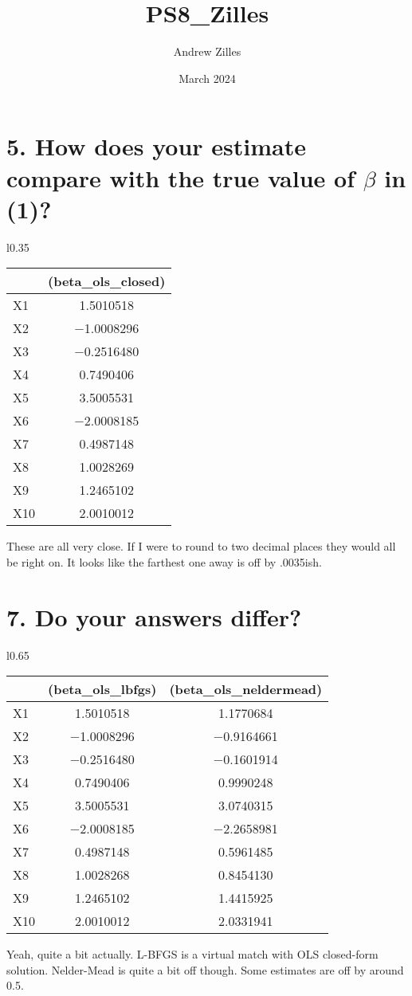 \documentclass{article}
\title{PS8\_Zilles}
\author{Andrew Zilles}
\date{March 2024}
\begin{document}
\maketitle

\section*{5. How does your estimate compare with the true value of ${\beta}$ in (1)?}

\begin{wraptable}{l}{0.35\textwidth}
\centering   
\begin{tabular}[t]{lc}
\toprule
  & (beta\_ols\_closed)\\
\midrule
X1 & \num{1.5010518}\\
X2 & \num{-1.0008296}\\
X3 & \num{-0.2516480}\\
X4 & \num{0.7490406}\\
X5 & \num{3.5005531}\\
X6 & \num{-2.0008185}\\
X7 & \num{0.4987148}\\
X8 & \num{1.0028269}\\
X9 & \num{1.2465102}\\
X10 & \num{2.0010012}\\
\bottomrule
\end{tabular}
\end{wraptable}

These are all very close. If I were to round to two decimal places they would all be right on. It looks like the farthest one away is off by .0035ish.


\clearpage
\section*{7. Do your answers differ?}

\begin{wraptable}{l}{0.65 \textwidth}
\centering
\begin{tabular}[t]{lcc}
\toprule
  & (beta\_ols\_lbfgs) & (beta\_ols\_neldermead)\\
\midrule
X1 & \num{1.5010518} & \num{1.1770684}\\
X2 & \num{-1.0008296} & \num{-0.9164661}\\
X3 & \num{-0.2516480} & \num{-0.1601914}\\
X4 & \num{0.7490406} & \num{0.9990248}\\
X5 & \num{3.5005531} & \num{3.0740315}\\
X6 & \num{-2.0008185} & \num{-2.2658981}\\
X7 & \num{0.4987148} & \num{0.5961485}\\
X8 & \num{1.0028268} & \num{0.8454130}\\
X9 & \num{1.2465102} & \num{1.4415925}\\
X10 & \num{2.0010012} & \num{2.0331941}\\
\bottomrule
\end{tabular}
\end{wraptable}
Yeah, quite a bit actually. L-BFGS is a virtual match with OLS closed-form solution. Nelder-Mead is quite a bit off though. Some estimates are off by around 0.5.
\end{document}
